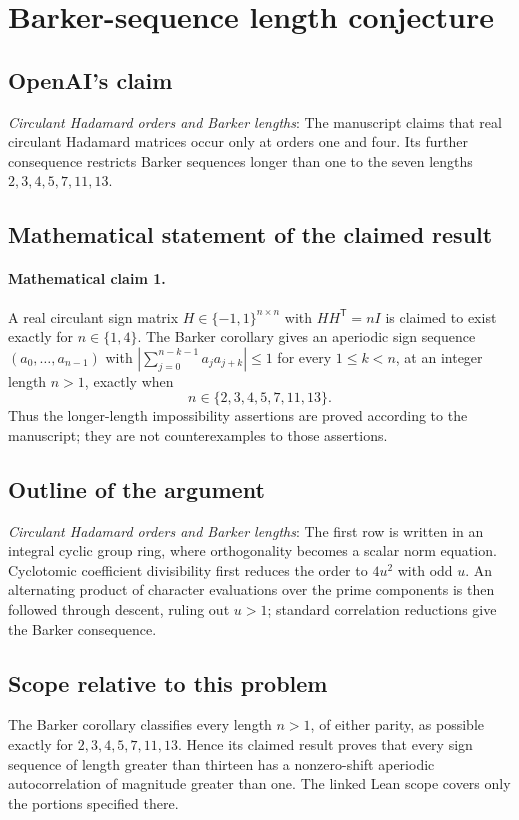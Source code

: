 \documentclass[11pt]{article}
\begin{document}
\section*{Barker-sequence length conjecture}

\subsection{OpenAI's claim}
\textit{Circulant Hadamard orders and Barker lengths}: The manuscript claims that real circulant Hadamard matrices occur only at orders one and four. Its further consequence restricts Barker sequences longer than one to the seven lengths $2,3,4,5,7,11,13$.

\subsection{Mathematical statement of the claimed result}
\paragraph{Mathematical claim 1.} A real circulant sign matrix $H\in\{-1,1\}^{n\times n}$ with $HH^{\mathsf T}=nI$ is claimed to exist exactly for $n\in\{1,4\}$. The Barker corollary gives an aperiodic sign sequence $(a_0,\ldots,a_{n-1})$ with $|\sum_{j=0}^{n-k-1}a_ja_{j+k}|\le1$ for every $1\le k<n$, at an integer length $n>1$, exactly when \[n\in\{2,3,4,5,7,11,13\}.\] Thus the longer-length impossibility assertions are proved according to the manuscript; they are not counterexamples to those assertions.

\subsection{Outline of the argument}
\textit{Circulant Hadamard orders and Barker lengths}: The first row is written in an integral cyclic group ring, where orthogonality becomes a scalar norm equation. Cyclotomic coefficient divisibility first reduces the order to $4u^2$ with odd $u$. An alternating product of character evaluations over the prime components is then followed through descent, ruling out $u>1$; standard correlation reductions give the Barker consequence.

\subsection{Scope relative to this problem}
The Barker corollary classifies every length $n>1$, of either parity, as possible exactly for $2,3,4,5,7,11,13$. Hence its claimed result proves that every sign sequence of length greater than thirteen has a nonzero-shift aperiodic autocorrelation of magnitude greater than one. The linked Lean scope covers only the portions specified there.
\end{document}

